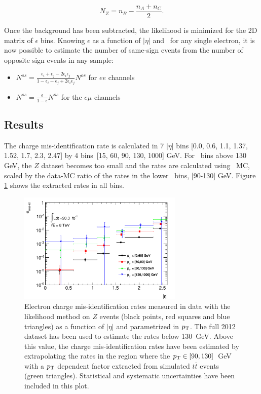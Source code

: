 \begin{equation}
N_Z=n_B-\frac{n_A+n_C}{2}.
\end{equation}
  
 Once the background has been subtracted, the likelihood is minimized for the 2D matrix of  $\epsilon$ bins. Knowing $\epsilon$ as a function of $|\eta|$ and \pt\ for any single electron, it is now possible to estimate the number of same-sign events from the number of opposite sign events in any sample:

\begin{itemize}
\item $N^{ss} = \frac{\epsilon_i +\epsilon_j -2\epsilon_i \epsilon_j}{1-\epsilon_i -\epsilon_j +2\epsilon_i \epsilon_j} N^{os}$ for $ee$ channels
\item $N^{ss} = \frac{\epsilon}{1-\epsilon} N^{os}$ for the $e\mu$ channels
\end{itemize}


\subsection{Results}

The charge mis-identification rate is calculated in 7 $|\eta|$ bins [0.0, 0.6, 1.1, 1.37, 1.52, 1.7, 2.3, 2.47] by 4 \pt bins\ [15, 60, 90, 130, 1000] GeV. For \pt\ bins above 130 GeV, the $Z$ dataset becomes too small and the rates are calculated using \ttbar\ MC, scaled by the data-MC ratio of the rates in the lower \pt\ bins, [90-130] GeV. Figure \ref{figure:background_cf} shows the extracted rates in all bins.

\begin{figure}[ht!]
\centering
\includegraphics[width=0.7\textwidth]{figs/qmis/Rates2D}
  \caption{Electron charge mis-identification rates  measured in data with the likelihood method  on $Z$ events (black points, red squares and blue triangles) as a function of $|\eta|$ and parametrized in $p_{\rm T}$. The full 2012 dataset has been used to estimate the rates below 130~GeV.   Above this value, the charge mis-identification rates have been estimated by extrapolating the rates in the region where the $p_{\rm T}\in[90,130]$~GeV with a $p_{\rm T}$ dependent factor extracted from simulated $t\bar t$ events (green triangles). Statistical and systematic uncertainties  have been included in this plot. \label{figure:background_cf}}
\end{figure}


